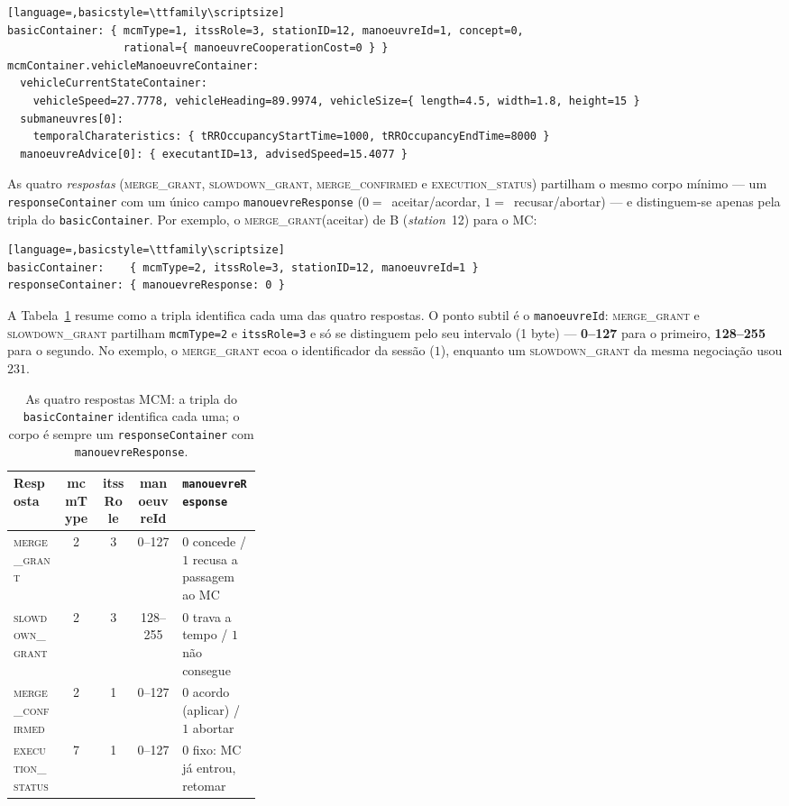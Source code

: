 \documentclass[11pt,a4paper]{article}
\begin{document}
\begin{lstlisting}[language=,basicstyle=\ttfamily\scriptsize]
basicContainer: { mcmType=1, itssRole=3, stationID=12, manoeuvreId=1, concept=0,
                  rational={ manoeuvreCooperationCost=0 } }
mcmContainer.vehicleManoeuvreContainer:
  vehicleCurrentStateContainer:
    vehicleSpeed=27.7778, vehicleHeading=89.9974, vehicleSize={ length=4.5, width=1.8, height=15 }
  submaneuvres[0]:
    temporalCharateristics: { tRROccupancyStartTime=1000, tRROccupancyEndTime=8000 }
  manoeuvreAdvice[0]: { executantID=13, advisedSpeed=15.4077 }
\end{lstlisting}

As quatro \emph{respostas} (\textsc{merge\_grant}, \textsc{slowdown\_grant},
\textsc{merge\_confirmed} e \textsc{execution\_status}) partilham o mesmo corpo mínimo --- um
\texttt{responseContainer} com um único campo \texttt{manouevreResponse}
($0=$~aceitar/acordar, $1=$~recusar/abortar) --- e distinguem-se apenas pela tripla do
\texttt{basicContainer}. Por exemplo, o \textsc{merge\_grant}(aceitar) de B
(\emph{station}~12) para o MC:

\begin{lstlisting}[language=,basicstyle=\ttfamily\scriptsize]
basicContainer:    { mcmType=2, itssRole=3, stationID=12, manoeuvreId=1 }
responseContainer: { manouevreResponse: 0 }
\end{lstlisting}

A Tabela~\ref{tab:mcm-respostas} resume como a tripla identifica cada uma das quatro
respostas. O ponto subtil é o \texttt{manoeuvreId}: \textsc{merge\_grant} e
\textsc{slowdown\_grant} partilham \texttt{mcmType=2} e \texttt{itssRole=3} e só se
distinguem pelo seu intervalo (1 byte) --- \textbf{0--127} para o primeiro, \textbf{128--255}
para o segundo. No exemplo, o \textsc{merge\_grant} ecoa o identificador da sessão ($1$),
enquanto um \textsc{slowdown\_grant} da mesma negociação usou $231$.

\begin{table}[H]
  \centering
  \small
  \renewcommand{\arraystretch}{1.2}
  \begin{tabular}{@{}lcccp{0.32\linewidth}@{}}
    \toprule
    \textbf{Resposta} & \textbf{mcmType} & \textbf{itssRole} & \textbf{manoeuvreId} &
      \textbf{\texttt{manouevreResponse}} \\
    \midrule
    \textsc{merge\_grant}      & 2 & 3 & 0--127   & $0$ concede / $1$ recusa a passagem ao MC \\
    \textsc{slowdown\_grant}   & 2 & 3 & 128--255 & $0$ trava a tempo / $1$ não consegue \\
    \textsc{merge\_confirmed}  & 2 & 1 & 0--127   & $0$ acordo (aplicar) / $1$ abortar \\
    \textsc{execution\_status} & 7 & 1 & 0--127   & $0$ fixo: MC já entrou, retomar \\
    \bottomrule
  \end{tabular}
  \caption{As quatro respostas MCM: a tripla do \texttt{basicContainer} identifica cada
  uma; o corpo é sempre um \texttt{responseContainer} com \texttt{manouevreResponse}.}
  \label{tab:mcm-respostas}
\end{table}
\end{document}
